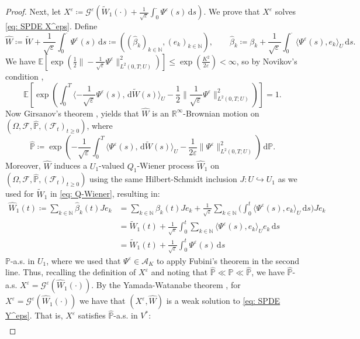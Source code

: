 \documentclass{amsart}
\newcommand{\dd}{\,\mathrm{d}}
\newcommand{\<}{\langle}
\newcommand{\?}{\rangle}
\newcommand{\into}{\hookrightarrow}
\theoremstyle{plain}
\theoremstyle{remark}
\theoremstyle{plain}
\numberwithin{equation}{section}
\def\N{{\mathbb N}}
\def\R{{\mathbb R}}
\newcommand{\E}{\mathbb{E}}
\newcommand{\F}{\mathcal{F}}
\renewcommand{\P}{\mathbb{P}}
\newcommand{\Om}{\Omega}
\newcommand{\eps}{\varepsilon}
\begin{document}
\begin{proof}
Next, let $X^\eps\coloneqq \mathcal{G}^{\eps}({\tilde{W}_1}(\cdot)+\frac{1}{\sqrt{\eps}}\int_0^{\cdot}{\Psi}^{\eps}(s)\dd s)$.
We prove that $X^\eps$ solves \eqref{eq: SPDE X^eps}. Define
\[
\hat{W}\coloneqq \tilde{W}+\frac{1}{\sqrt{\eps}}\int_0^{\cdot} \Psi^{\eps}(s)\dd s\coloneqq ((\hat{\beta}_k)_{k\in\N},(e_k)_{k\in\N}), \qquad \hat{\beta}_k\coloneqq \beta_k+\frac{1}{\sqrt{\eps}}\int_0^{\cdot} \<\Psi^{\eps}(s),e_k\?_U\dd s.
\]
We have
$\E[\exp(\frac{1}{2}\|-\frac{1}{\sqrt{\eps}}\Psi^\eps\|_{L^2(0,T;U)}^2)]\leq
\exp(\frac{K^2}{2\eps})<\infty$, so by Novikov's condition \cite[Prop. 5.12]{karatzas98},
\begin{equation*}
  \E\left[\exp\left(\int_0^T\<-\frac{1}{\sqrt{\eps}}\Psi^\eps(s),\dd \tilde{W}(s)\?_{U}-\frac{1}{2}\|\frac{1}{\sqrt{\eps}}\Psi^\eps\|_{L^2(0,T;U)}^2\right)\right]=1.
\end{equation*}
Now Girsanov's theorem \cite[Proposition I.0.6]{liurockner15}, \cite[Th. 2.3]{ferrario13} yields that $\hat{W}$ is an $\R^\infty$-Brownian motion on $(\Om,\F,\hat{\P},(\F_t)_{t\geq 0})$, where
\[
\hat{\P}\coloneqq  \exp\left(-\frac{1}{\sqrt{\eps}}\int_0^T\<\Psi^\eps(s),\dd \tilde{W}(s)\?_{U}-\frac{1}{2\eps}\|\Psi^\eps\|_{L^2(0,T;U)}^2\right) \dd \P.
\]
Moreover, $\hat{W}$ induces a $U_1$-valued $Q_1$-Wiener process $\hat{W}_1$ on $(\Om,\F,\hat{\P},(\F_t)_{t\geq 0})$ using the same Hilbert-Schmidt inclusion $J\colon U\into U_1$ as we used for $\tilde{W}_1$ in \eqref{eq: Q-Wiener}, resulting in:
\begin{align*}
\hat{W}_1(t)\coloneqq \sum_{k\in\N}\hat{\beta}_k(t)Je_k&=\sum_{k\in\N}{\beta}_k(t)Je_k+\frac{1}{\sqrt{\eps}}\sum_{k\in\N}\Big(\int_0^{t} \<\Psi^{\eps}(s),e_k\?_U\dd s\Big)Je_k\\
&=\tilde{W}_1(t)+\frac{1}{\sqrt{\eps}}\int_0^{t}\sum_{k\in\N} \<\Psi^{\eps}(s),e_k\?_Ue_k\dd s\\
&=\tilde{W}_1(t)+\frac{1}{\sqrt{\eps}}\int_0^{t} \Psi^{\eps}(s)\dd s
\end{align*}
$\P$-a.s. \!in $U_1$, where we used that $\Psi^{\eps}\in\mathcal{A}_K$ to apply Fubini's theorem in the second line. Thus, recalling the definition of ${X}^\eps$ and noting that  $\hat{\P}\ll \P\ll \hat{\P}$, we have $\hat{\P}$-a.s. \!$X^\eps =\mathcal{G}^{\eps}(\hat{W}_1(\cdot))$.
By the Yamada-Watanabe theorem \cite[Th. 2.1, Def. 1.9]{rock08}, for ${X}^\eps=\mathcal{G}^{\eps}(\hat{W}_1(\cdot))$ we have that $({X}^\eps, \hat{W})$ is a weak solution to \eqref{eq: SPDE Y^eps}. That is, ${X}^\eps$ satisfies $\hat{\P}$-a.s. \!in $V^*$:
\begin{align}\label{eq: X eps}

\end{align}
\end{proof}
\end{document}
